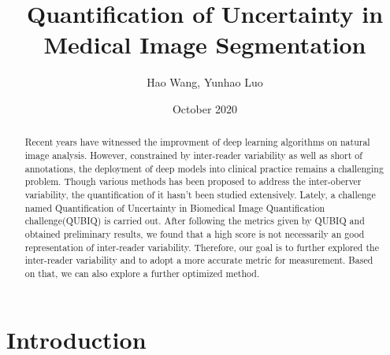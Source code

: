 \documentclass[12pt]{extarticle}
\title{Quantification of Uncertainty in Medical Image Segmentation}
\author{Hao Wang, Yunhao Luo}
\date{October 2020}
\begin{document}
\maketitle
\begin{abstract}
Recent years have witnessed the improvment of deep learning algorithms on natural image 
analysis. However, constrained by inter-reader variability as well as short of annotations, 
the deployment of deep models into clinical practice remains a challenging problem. Though various methods
has been proposed to address the inter-oberver variability, the quantification of it hasn't been 
studied extensively. Lately, a challenge named Quantification of Uncertainty in Biomedical Image Quantification challenge(QUBIQ)
is carried out. After following the metrics given by QUBIQ and obtained preliminary results, we found that a high score 
is not necessarily an good representation of inter-reader variability. Therefore, our goal is to 
further explored the inter-reader variability and to adopt a more accurate metric for measurement. 
Based on that, we can also explore a further optimized method. 
\end{abstract}
\section{Introduction}
\end{document}
